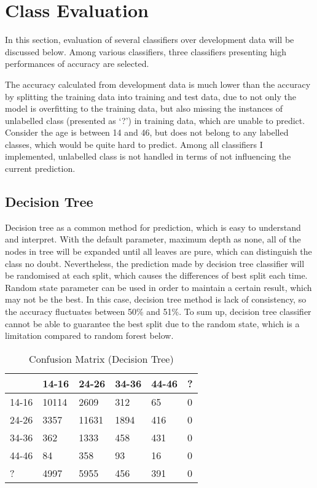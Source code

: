 \documentclass[11pt]{article}
\begin{document}
\section{Class Evaluation}
In this section, evaluation of several classifiers over development data will be discussed below. Among various classifiers, three classifiers presenting high performances of accuracy are selected.

The accuracy calculated from development data is much lower than the accuracy by splitting the training data into training and test data, due to not only the model is overfitting to the training data, but also missing the instances of unlabelled class (presented as ‘?’) in training data, which are unable to predict. Consider the age is between 14 and 46, but does not belong to any labelled classes, which would be quite hard to predict. Among all classifiers I implemented, unlabelled class is not handled in terms of not influencing the current prediction.

\subsection{Decision Tree}
Decision tree as a common method for prediction, which is easy to understand and interpret. With the default parameter, maximum depth as none, all of the nodes in tree will be expanded until all leaves are pure, which can distinguish the class no doubt.
Nevertheless, the prediction made by decision tree classifier will be randomised at each split, which causes the differences of best split each time. Random state parameter can be used in order to maintain a certain result, which may not be the best. In this case, decision tree method is lack of consistency, so the accuracy fluctuates between 50\% and 51\%.
To sum up, decision tree classifier cannot be able to guarantee the best split due to the random state, which is a limitation compared to random forest below.

\begin{table}[h]
\centering
\begin{tabular}{|l|l|l|l|l|l|}
\hline
      & 14-16 & 24-26 & 34-36 & 44-46 & ? \\ \hline
14-16 & 10114 & 2609  & 312   & 65    & 0 \\ \hline
24-26 & 3357  & 11631 & 1894  & 416   & 0 \\ \hline
34-36 & 362   & 1333  & 458   & 431   & 0 \\ \hline
44-46 & 84    & 358   & 93    & 16    & 0 \\ \hline
?     & 4997  & 5955  & 456   & 391   & 0 \\ \hline
\end{tabular}
\caption{Confusion Matrix (Decision Tree)}
\label{table2}
\end{table}
\end{document}
